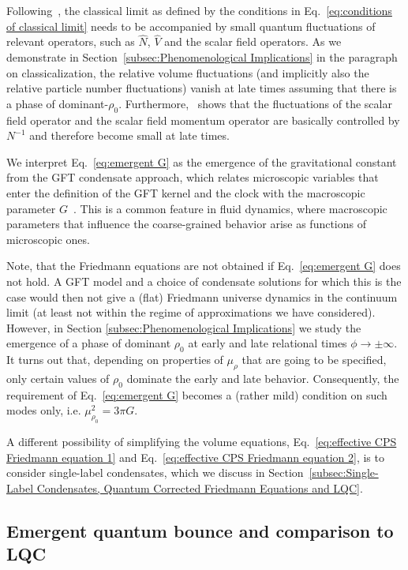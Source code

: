 \documentclass[11pt,a4paper]{article}
\begin{document}
Following~\cite{Marchetti:2020qsq}, the classical limit as defined by the conditions in Eq.~\eqref{eq:conditions of classical limit} needs to be accompanied by small quantum fluctuations of relevant operators, such as $\hat{N}$, $\hat{V}$ and the scalar field operators. As we demonstrate in Section~\ref{subsec:Phenomenological Implications} in the paragraph on classicalization, the relative volume fluctuations (and implicitly also the relative particle number fluctuations) vanish at late times assuming that there is a phase of dominant-$\rho_0$. Furthermore,~\cite{Marchetti:2020qsq} shows that the fluctuations of the scalar field operator and the scalar field momentum operator are basically controlled by $N^{-1}$ and therefore become small at late times. 

We interpret Eq.~\eqref{eq:emergent G} as the emergence of the gravitational constant from the GFT condensate approach, which relates microscopic variables that enter the definition of the GFT kernel and the clock with the macroscopic parameter $G$~\cite{deCesare:2016axk}. This is a common feature in fluid dynamics, where macroscopic parameters that influence the coarse-grained behavior arise as functions of microscopic ones. 

Note, that the Friedmann equations are not obtained if Eq.~\eqref{eq:emergent G} does not hold. A GFT model and a choice of condensate solutions for which this is the case would then not give a (flat) Friedmann universe dynamics in the continuum limit (at least not within the regime of approximations we have considered). However, in Section \ref{subsec:Phenomenological Implications} we study the emergence of a phase of dominant $\rho_0$ at early and late relational times $\phi\rightarrow\pm\infty$. It turns out that, depending on properties of $\mu_{\rho}$ that are going to be specified, only certain values of $\rho_0$ dominate the early and late behavior. Consequently, the requirement of  Eq.~\eqref{eq:emergent G} becomes a (rather mild) condition on such modes only, i.e. $\mu_{\rho_0}^2 = 3\pi G$.

A different possibility of simplifying the volume equations, Eq.~\eqref{eq:effective CPS Friedmann equation 1} and Eq.~\eqref{eq:effective CPS Friedmann equation 2}, is to consider single-label condensates, which we discuss in Section~\ref{subsec:Single-Label Condensates, Quantum Corrected Friedmann Equations and LQC}.

\subsection{Emergent quantum bounce and comparison to LQC}\label{subsec:Emergent Quantum Bounce}
\end{document}
